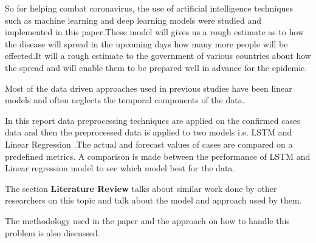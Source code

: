 
So for helping combat coronavirus, the use of artificial intelligence
techniques such as machine learning and deep learning models were studied and
implemented in this paper.These model
will gives us a rough estimate as to how the disease will spread in the upcoming days how many more people
will be effected.It will a rough estimate to the government of various countries about how the spread and will
enable them to be prepared well in advance for the epidemic.

Most of the data driven approaches used in previous studies
\cite{knight2016bridging} have been linear models and often neglects the
temporal components of the data.


In this report data preprocessing techniques are  applied on the confirmed cases data and then the preprocessed
data is applied to two models i.e. LSTM and Linear Regression .The actual and
forecast values of  cases are compared on
a predefined metrics. A comparison is made between the performance of
LSTM and Linear regression model to see which model best for the data.

The section \textbf{Literature Review} talks about similar work done by
other researchers on this topic and talk about the model and approach used by
them.

The methodology used in the paper and the approach on how to handle this
problem is also discussed.


